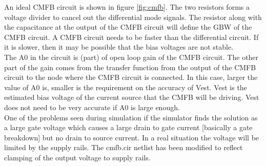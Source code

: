 \documentclass{article}
\begin{document}
An ideal CMFB circuit is shown in figure \ref{fig:cmfb}. The two resistors forms a voltage divider to cancel out the differential mode signals. The resistor along with the capacitance at the output of the CMFB circuit will define the GBW of the CMFB circuit. A CMFB circuit needs to be faster than the differential circuit. If it is slower, then it may be possible that the bias voltages are not stable. \\
The A0 in the circuit is (part) of open loop gain of the CMFB circuit. The other part of the gain comes from the transfer function from the output of the CMFB circuit to the node where the CMFB circuit is connected. In this case, larger the value of A0 is, smaller is the requirement on the accuracy of Vest. Vest is the estimated bias voltage of the current source that the CMFB will be driving. Vest does not need to be very accurate if A0 is large enough. \\
One of the problems seen during simulation if the simulator finds the solution as a large gate voltage which causes a large drain to gate current [basically a gate breakdown] but no drain to source current. In a real situation the voltage will be limited by the supply rails. The cmfb.cir netlist has been modified to reflect clamping of the output voltage to supply rails.


\end{document}
